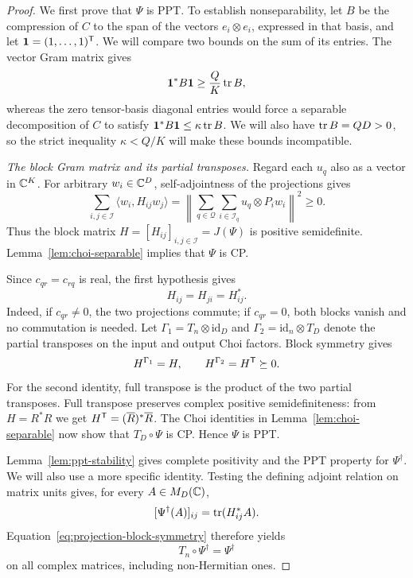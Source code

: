 \begin{proof}
We first prove that $\Psi$ is PPT.  To establish nonseparability, let
$B$ be the compression of $C$ to the span of the vectors
$e_i\otimes e_i$, expressed in that basis, and let
$\mathbf1=(1,\ldots,1)^\mathsf T$.  We will compare two bounds on the sum
of its entries.  The vector Gram matrix gives
\[
 \mathbf1^*B\mathbf1\geq\frac QK\operatorname{tr} B,
\]
whereas the zero tensor-basis diagonal entries would force a separable
decomposition of $C$ to satisfy
$\mathbf1^*B\mathbf1\leq\kappa\operatorname{tr} B$.
We will also have $\operatorname{tr} B=QD>0$, so the strict inequality $\kappa<Q/K$
will make these bounds incompatible.

\emph{The block Gram matrix and its partial transposes.}
Regard each \(u_q\) also as a vector in \(\mathbb C^K\).  For arbitrary
\(w_i\in\mathbb C^D\), self-adjointness of the projections gives
\begin{equation}\label{eq:projection-block-gram}
 \sum_{i,j\in\mathcal I}\langle w_i,H_{ij}w_j\rangle
 =
 \left\|
   \sum_{q\in\mathcal Q}\sum_{i\in\mathcal I_q}u_q\otimes P_iw_i
 \right\|^2\geq0.
\end{equation}
Thus the block matrix
\(H=[H_{ij}]_{i,j\in\mathcal I}=J(\Psi)\) is positive semidefinite.
Lemma~\ref{lem:choi-separable} implies that \(\Psi\) is CP.

Since \(c_{qr}=c_{rq}\) is real, the first hypothesis gives
\begin{equation}\label{eq:projection-block-symmetry}
 H_{ij}=H_{ji}=H_{ij}^*.
\end{equation}
Indeed, if \(c_{qr}\ne0\), the two projections commute; if
\(c_{qr}=0\), both blocks vanish and no commutation is needed.
Let \(\Gamma_1=T_n\otimes\mathrm{id}_D\) and
\(\Gamma_2=\mathrm{id}_n\otimes T_D\) denote the partial transposes
on the input and output Choi factors.  Block symmetry gives
\begin{equation}\label{eq:projection-partial-transposes}
 H^{\Gamma_1}=H,\qquad
 H^{\Gamma_2}=H^{\mathsf T}\succeq0.
\end{equation}
For the second identity, full transpose is the product of the two
partial transposes.  Full transpose preserves complex positive
semidefiniteness: from \(H=R^*R\) we get
\(H^{\mathsf T}=(\overline R)^*\overline R\).  The Choi identities in
Lemma~\ref{lem:choi-separable} now show that \(T_D\circ\Psi\) is CP.
Hence \(\Psi\) is PPT.

Lemma~\ref{lem:ppt-stability} gives complete positivity and the PPT
property for \(\Psi^\dagger\).  We will also use a more specific
identity.  Testing the defining adjoint relation on matrix units gives,
for every \(A\in M_{D}(\mathbb C)\),
\begin{equation}\label{eq:projection-adjoint}
 [\Psi^\dagger(A)]_{ij}=\operatorname{tr}(H_{ij}^*A).
\end{equation}
Equation~\eqref{eq:projection-block-symmetry} therefore yields
\begin{equation}\label{eq:projection-adjoint-transpose}
 T_n\circ\Psi^\dagger=\Psi^\dagger
\end{equation}
on all complex matrices, including non-Hermitian ones.


\end{proof}
